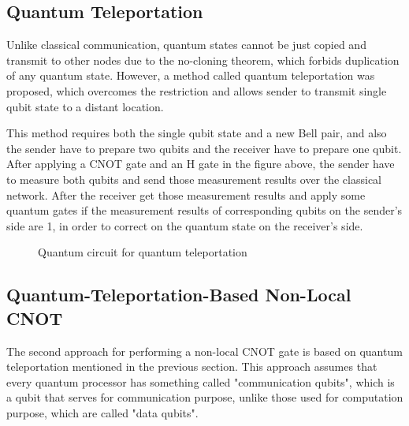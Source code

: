 \newpage 

\subsection{Quantum Teleportation}

  Unlike classical communication, quantum states cannot be just copied and transmit to other nodes due to the no-cloning theorem, which forbids duplication of any quantum state.  However, a method called quantum teleportation \cite{teleportation} was proposed, which overcomes the restriction and allows sender to transmit single qubit state to a distant location. 
 		
This method requires both the single qubit state and a new Bell pair, and also the sender have to prepare two qubits and the receiver have to prepare one qubit.  After applying a CNOT gate and an H gate in the figure above, the sender have to measure both qubits and send those measurement results over the classical network.  After the receiver get those measurement results and apply some quantum gates if the measurement results of corresponding qubits on the sender's side are 1, in order to correct on the quantum state on the receiver's side.

\begin{figure}[ht]
  	\begin{center}
	\caption{Quantum circuit for quantum teleportation}
	\end{center}
\end{figure}

\subsection{Quantum-Teleportation-Based Non-Local CNOT}

 The second approach for performing a non-local CNOT gate is based on quantum teleportation mentioned in the previous section.  This approach assumes that every quantum processor has something called "communication qubits", which is a qubit that serves for communication purpose, unlike those used for computation purpose, which are called "data qubits".
 
